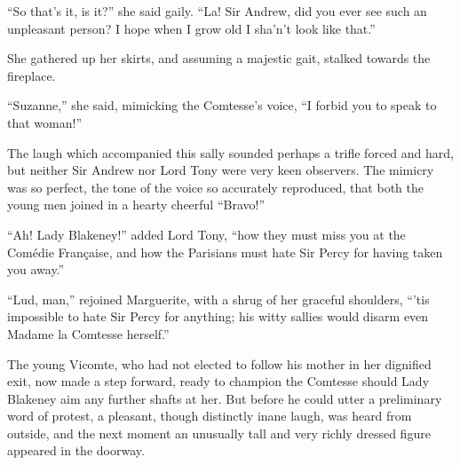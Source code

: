 \enquote{So that's it, is it?} she said gaily. \enquote{La! Sir Andrew, did you ever see such an unpleasant person? I hope when I grow old I sha'n’t look like that.}

She gathered up her skirts, and assuming a majestic gait, stalked towards the fireplace.

\enquote{Suzanne,} she said, mimicking the Comtesse's voice, \enquote{I forbid you to speak to that woman!}

The laugh which accompanied this sally sounded perhaps a trifle forced and hard, but neither Sir Andrew nor Lord Tony were very keen observers. The mimicry was so perfect, the tone of the voice so accurately reproduced, that both the young men joined in a hearty cheerful \enquote{Bravo!}

\enquote{Ah! Lady Blakeney!} added Lord Tony, \enquote{how they must miss you at the Comédie Française, and how the Parisians must hate Sir Percy for having taken you away.}

\enquote{Lud, man,} rejoined Marguerite, with a shrug of her graceful shoul\-ders, \enquote{’tis impossible to hate Sir Percy for anything; his witty sallies would disarm even Madame la Comtesse herself.}

The young Vicomte, who had not elected to follow his mother in her dignified exit, now made a step forward, ready to champion the Comtesse should Lady Blakeney aim any further shafts at her. But before he could utter a preliminary word of protest, a pleasant, though distinctly inane laugh, was heard from outside, and the next moment an unusually tall and very richly dressed figure appeared in the doorway.